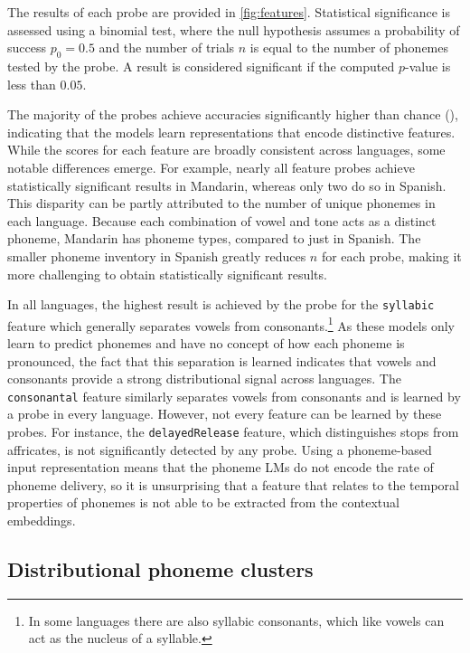 The results of each probe are provided in \cref{fig:features}. Statistical significance is assessed using a binomial test, where the null hypothesis assumes a probability of success \( p_0 = 0.5 \) and the number of trials \( n \) is equal to the number of phonemes tested by the probe. A result is considered significant if the computed \( p \)-value is less than $0.05$.

The majority of the probes achieve accuracies significantly higher than chance (), indicating that the models learn representations that encode distinctive features. While the scores for each feature are broadly consistent across languages, some notable differences emerge. For example, nearly all feature probes achieve statistically significant results in Mandarin, whereas only two do so in Spanish. This disparity can be partly attributed to the number of unique phonemes in each language. Because each combination of vowel and tone acts as a distinct phoneme, Mandarin has  phoneme types, compared to just  in Spanish. The smaller phoneme inventory in Spanish greatly reduces $n$ for each probe, making it more challenging to obtain statistically significant results.

In all  languages, the highest result is achieved by the probe for the \texttt{syllabic} feature which generally separates vowels from consonants.\footnote{In some languages there are also syllabic consonants, which like vowels can act as the nucleus of a syllable.} As these models only learn to predict phonemes and have no concept of how each phoneme is pronounced, the fact that this separation is learned indicates that vowels and consonants provide a strong distributional signal across languages. The \texttt{consonantal} feature similarly separates vowels from consonants and is learned by a probe in every language. However, not every feature can be learned by these probes. For instance, the \texttt{delayedRelease} feature, which distinguishes stops from affricates, is not significantly detected by any probe. Using a phoneme-based input representation means that the phoneme LMs do not encode the rate of phoneme delivery, so it is unsurprising that a feature that relates to the temporal properties of phonemes is not able to be extracted from the contextual embeddings.

\subsection{Distributional phoneme clusters}

